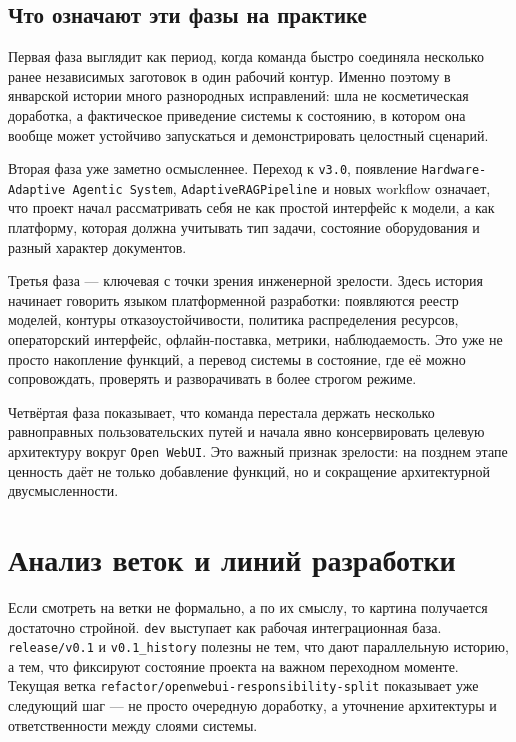 \documentclass[12pt,a4paper]{article}
\begin{document}
\subsection{Что означают эти фазы на практике}

Первая фаза выглядит как период, когда команда быстро соединяла несколько ранее независимых заготовок в один рабочий контур. Именно поэтому в январской истории много разнородных исправлений: шла не косметическая доработка, а фактическое приведение системы к состоянию, в котором она вообще может устойчиво запускаться и демонстрировать целостный сценарий.

Вторая фаза уже заметно осмысленнее. Переход к \texttt{v3.0}, появление \texttt{Hardware-Adaptive Agentic System}, \texttt{AdaptiveRAGPipeline} и новых workflow означает, что проект начал рассматривать себя не как простой интерфейс к модели, а как платформу, которая должна учитывать тип задачи, состояние оборудования и разный характер документов.

Третья фаза --- ключевая с точки зрения инженерной зрелости. Здесь история начинает говорить языком платформенной разработки: появляются реестр моделей, контуры отказоустойчивости, политика распределения ресурсов, операторский интерфейс, офлайн-поставка, метрики, наблюдаемость. Это уже не просто накопление функций, а перевод системы в состояние, где её можно сопровождать, проверять и разворачивать в более строгом режиме.

Четвёртая фаза показывает, что команда перестала держать несколько равноправных пользовательских путей и начала явно консервировать целевую архитектуру вокруг \texttt{Open WebUI}. Это важный признак зрелости: на позднем этапе ценность даёт не только добавление функций, но и сокращение архитектурной двусмысленности.

\section{Анализ веток и линий разработки}



Если смотреть на ветки не формально, а по их смыслу, то картина получается достаточно стройной. \texttt{dev} выступает как рабочая интеграционная база. \texttt{release/v0.1} и \texttt{v0.1\_history} полезны не тем, что дают параллельную историю, а тем, что фиксируют состояние проекта на важном переходном моменте. Текущая ветка \texttt{refactor/openwebui-responsibility-split} показывает уже следующий шаг --- не просто очередную доработку, а уточнение архитектуры и ответственности между слоями системы.
\end{document}
